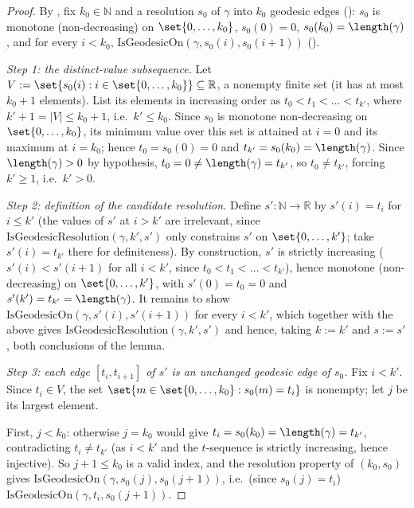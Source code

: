 \begin{proof}
  By , fix $k_0 \in \mathbb{N}$ and a resolution $s_0$ of $\gamma$ into
  $k_0$ geodesic edges (): $s_0$ is monotone (non-decreasing) on
  $\set{0,\dots,k_0}$, $s_0(0)=0$, $s_0(k_0)=\length(\gamma)$, and for every $i<k_0$,
  $\mathrm{IsGeodesicOn}(\gamma,s_0(i),s_0(i+1))$ ().

  \emph{Step 1: the distinct-value subsequence.} Let $V := \set{s_0(i) : i \in \set{0,\dots,k_0}}
  \subseteq \mathbb{R}$, a nonempty finite set (it has at most $k_0+1$ elements). List its elements
  in increasing order as $t_0 < t_1 < \dots < t_{k'}$, where $k'+1 = |V| \le k_0+1$, i.e.\ $k' \le
  k_0$. Since $s_0$ is monotone non-decreasing on $\set{0,\dots,k_0}$, its minimum value over this
  set is attained at $i=0$ and its maximum at $i=k_0$; hence $t_0 = s_0(0) = 0$ and $t_{k'} =
  s_0(k_0) = \length(\gamma)$. Since $\length(\gamma) > 0$ by hypothesis, $t_0 = 0 \ne \length(\gamma)
  = t_{k'}$, so $t_0 \ne t_{k'}$, forcing $k' \ge 1$, i.e.\ $k' > 0$.

  \emph{Step 2: definition of the candidate resolution.} Define $s' \colon \mathbb{N} \to
  \mathbb{R}$ by $s'(i) = t_i$ for $i \le k'$ (the values of $s'$ at $i > k'$ are irrelevant, since
  $\mathrm{IsGeodesicResolution}(\gamma,k',s')$ only constrains $s'$ on $\set{0,\dots,k'}$; take
  $s'(i) = t_{k'}$ there for definiteness). By construction, $s'$ is strictly increasing
  ($s'(i)<s'(i+1)$ for all $i<k'$, since $t_0<t_1<\dots<t_{k'}$), hence monotone (non-decreasing) on
  $\set{0,\dots,k'}$, with $s'(0)=t_0=0$ and $s'(k')=t_{k'}=\length(\gamma)$. It remains to show
  $\mathrm{IsGeodesicOn}(\gamma,s'(i),s'(i+1))$ for every $i<k'$, which together with the above gives
  $\mathrm{IsGeodesicResolution}(\gamma,k',s')$ and hence, taking $k:=k'$ and $s:=s'$, both
  conclusions of the lemma.

  \emph{Step 3: each edge $[t_i,t_{i+1}]$ of $s'$ is an unchanged geodesic edge of $s_0$.} Fix $i <
  k'$. Since $t_i \in V$, the set $\set{m \in \set{0,\dots,k_0} : s_0(m) = t_i}$ is nonempty; let $j$
  be its largest element.

  First, $j < k_0$: otherwise $j = k_0$ would give $t_i = s_0(k_0) = \length(\gamma) = t_{k'}$,
  contradicting $t_i \ne t_{k'}$ (as $i < k' $ and the $t$-sequence is strictly increasing, hence
  injective). So $j+1 \le k_0$ is a valid index, and the resolution property of $(k_0,s_0)$ gives
  $\mathrm{IsGeodesicOn}(\gamma, s_0(j), s_0(j+1))$, i.e.\ (since $s_0(j)=t_i$)
  $\mathrm{IsGeodesicOn}(\gamma,t_i,s_0(j+1))$.


\end{proof}
